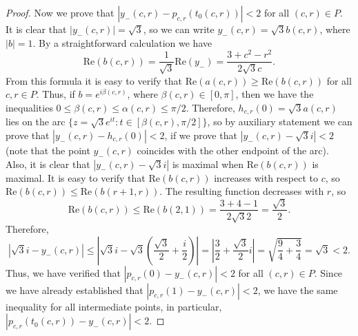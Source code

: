 \documentclass{amsart}
\numberwithin{equation}{section}
\theoremstyle{definition}
\theoremstyle{remark}
\begin{document}
\begin{proof}
		Now we prove that $|y_-(c,r) - p_{c,r}(t_0(c,r))| < 2$ for all $(c,r) \in P$. It is clear that $|y_-(c,r)| = \sqrt{3}$, so we can write $y_-(c,r) = \sqrt{3}b(c,r)$, where $|b| = 1$. By a straightforward calculation we have
		\[
		\mathrm{Re}(b(c,r)) = \dfrac{1}{\sqrt{3}} \mathrm{Re}(y_-) = \dfrac{3 + c^2 - r^2}{2\sqrt{3}c}.
		\]
		From this formula it is easy to verify that $\mathrm{Re}(a(c,r)) \ge \mathrm{Re}(b(c,r))$ for all $c,r \in P$. Thus, if $b = e^{i\beta(c,r)}$, where $\beta(c,r) \in [0, \pi]$, then we have the inequalities $0 \le \beta(c,r) \le \alpha(c,r) \le \pi/2$. Therefore, $h_{c,r}(0) = \sqrt{3}a(c,r)$ lies on the arc $\{z = \sqrt{3}e^{it}: t \in [\beta(c,r), \pi/2]\}$, so by auxiliary statement we can prove that $|y_-(c,r) - h_{c,r}(0)| < 2$, if we prove that $|y_-(c,r) - \sqrt{3}i| < 2$ (note that the point $y_-(c,r)$ coincides with the other endpoint of the arc). Also, it is clear that $|y_-(c,r) - \sqrt{3}i|$ is maximal when $\mathrm{Re}(b(c,r))$ is maximal. It is easy to verify that $\mathrm{Re}(b(c,r))$ increases with respect to $c$, so $\mathrm{Re}(b(c,r)) \le \mathrm{Re}(b(r+1,r))$. The resulting function decreases with $r$, so 
		\[
		\mathrm{Re}(b(c,r)) \le \mathrm{Re}(b(2,1)) = \dfrac{3 + 4 - 1}{2\sqrt{3}2} = \dfrac{\sqrt{3}}{2}.
		\]
		Therefore, 
		\[
		|\sqrt{3}i - y_{-}(c,r)| \le \left|\sqrt{3}i - \sqrt{3}\left(\dfrac{\sqrt{3}}{2} + \dfrac{i}{2}\right)\right| = \left|\dfrac{3}{2} + \dfrac{\sqrt{3}}{2}i\right| = \sqrt{\dfrac{9}{4} + \dfrac{3}{4}} = \sqrt{3} < 2.
		\]
		Thus, we have verified that $|p_{c,r}(0) - y_-(c,r)| < 2$ for all $(c,r) \in P$. Since we have already established that $|p_{c,r}(1) - y_-(c,r)| < 2$, we have the same inequality for all intermediate points, in particular, $|p_{c,r}(t_0(c,r)) - y_-(c,r)| < 2$.
		

\end{proof}
\end{document}

